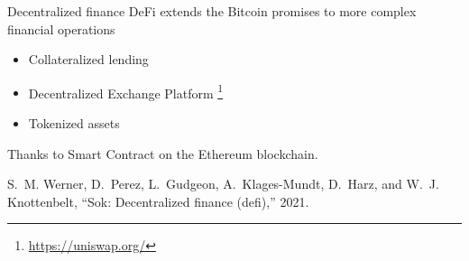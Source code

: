 \documentclass{beamer}
\newcommand\blfootnote[1]{%
  \begingroup
  \renewcommand\thefootnote{}\footnote{#1}%
  \addtocounter{footnote}{-1}%
  \endgroup
}
\begin{document}
\begin{frame}{Decentralized finance}
DeFi extends the Bitcoin promises to more complex financial operations 
\begin{itemize}
  \item Collateralized lending
  \item Decentralized Exchange Platform\blfootnote{\url{https://uniswap.org/}}
  \item Tokenized assets
\end{itemize}
\vspace{0.3cm}
Thanks to Smart Contract on the Ethereum blockchain.
\vspace{0.3cm}
\scriptsize
\begin{thebibliography}{1}

S.~M. Werner, D.~Perez, L.~Gudgeon, A.~Klages-Mundt, D.~Harz, and W.~J.
  Knottenbelt, ``Sok: Decentralized finance (defi),'' 2021.

\end{thebibliography}

\end{frame}
\end{document}
